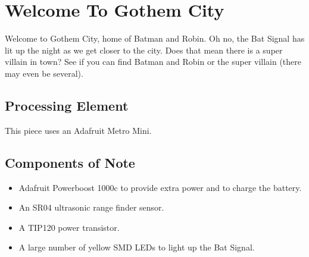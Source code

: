 %
%
%
%
% 
%
%
%
%
%
% 
%

\section{Welcome To Gothem City}

Welcome to Gothem City, home of Batman and Robin. Oh no, the Bat Signal has
lit up the night as we get closer to the city. Does that mean there is a super
villain in town? See if you can find Batman and Robin or the super villain
(there may even be several). 

\subsection*{Processing Element}

This piece uses an Adafruit Metro Mini.

\subsection*{Components of Note}

\begin{itemize}
\item Adafruit Powerboost 1000c to provide extra power and to charge the battery.
\item An SR04 ultrasonic range finder sensor.
\item A TIP120 power transistor.
\item A large number of yellow SMD LEDs to light up the Bat Signal.
\end{itemize}

